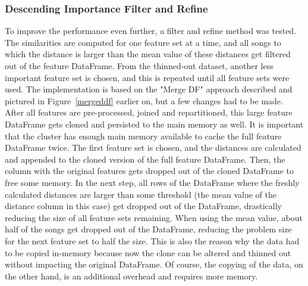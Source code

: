 \subsubsection{Descending Importance Filter and Refine}\label{farfs}

To improve the performance even further, a filter and refine method was tested. The similarities are computed for one feature set at a time, and all songs to which the distance is larger than the mean value of these distances get filtered out of the feature DataFrame. From the thinned-out dataset, another less important feature set is chosen, and this is repeated until all feature sets were used. 
The implementation is based on the "Merge DF" approach described and pictured in Figure~\ref{mergeddf} earlier on, but a few changes had to be made. After all features are pre-processed, joined and repartitioned, this large feature DataFrame gets cloned and persisted to the main memory as well. It is important that the cluster has enough main memory available to cache the full feature DataFrame twice. 
\noindent The first feature set is chosen, and the distances are calculated and appended to the cloned version of the full feature DataFrame. Then, the column with the original features gets dropped out of the cloned DataFrame to free some memory. In the next step, all rows of the DataFrame where the freshly calculated distances are larger than some threshold (the mean value of the distance column in this case) get dropped out of the DataFrame, drastically reducing the size of all feature sets remaining.
When using the mean value, about half of the songs get dropped out of the DataFrame, reducing the problem size for the next feature set to half the size. This is also the reason why the data had to be copied in-memory because now the clone can be altered and thinned out without impacting the original DataFrame. Of course, the copying of the data, on the other hand, is an additional overhead and requires more memory. 

